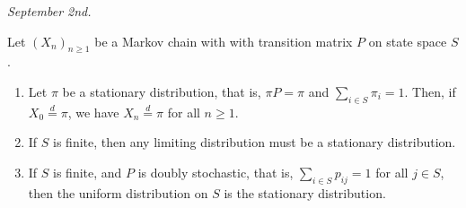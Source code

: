 \noindent \textit{September 2nd.}
\begin{proposition}
    Let $(X_{n})_{n \geq 1}$ be a Markov chain with with transition matrix $P$ on state space $S$.
    \begin{enumerate}
        \item Let $\pi$ be a stationary distribution, that is, $\pi P = \pi$ and $\sum_{i \in S} \pi_{i} = 1$. Then, if $X_{0} \overset{d}{=} \pi$, we have $X_{n} \overset{d}{=} \pi$ for all $n \geq 1$.
        \item If $S$ is finite, then any limiting distribution must be a stationary distribution.
        \item If $S$ is finite, and $P$ is doubly stochastic, that is, $\sum_{i \in S} p_{ij} = 1$ for all $j \in S$, then the uniform distribution on $S$ is the stationary distribution.
    \end{enumerate}
\end{proposition}

